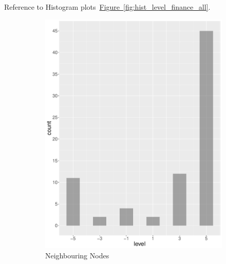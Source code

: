 Reference to Histogram plots~\hyperref[fig:hist_level_finance_all]{Figure~\ref*{fig:hist_level_finance_all}}.
\begin{figure}
    \centering
    \begin{subfigure}[b]{0.4\textwidth}
        \includegraphics[width=\textwidth]{plots/finance/hist_level_nn}
        \caption{Neighbouring Nodes}
        \label{fig:hist_level_finance_nn}
    \end{subfigure}
    ~
    \begin{subfigure}[b]{0.4\textwidth}

\end{subfigure}
\end{figure}
